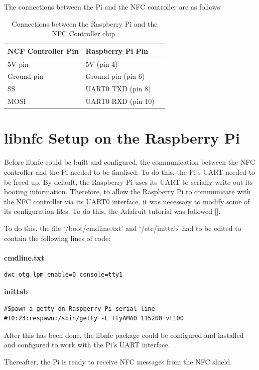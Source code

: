 The connections between the Pi and the NFC controller are as follows: 

\begin{table}
\centering
 \caption{Connections between the Raspberry Pi and the NFC Controller chip.}
 \begin{tabular}{|l|l|l|}
  \hline
  \textbf{NCF Controller Pin} & \textbf{Raspberry Pi Pin}\\\hline\hline
  5V pin & 5V (pin 4) \\\hline
  Ground pin & Ground pin (pin 6) \\\hline
  SS & UART0 TXD (pin 8) \\\hline
  MOSI & UART0 RXD (pin 10) \\\hline
 \end{tabular}
\end{table}

\section{libnfc Setup on the Raspberry Pi}

Before libnfc could be built and configured, the communication between the NFC
controller and the Pi needed to be finalised. To do this, the Pi's UART needed
to be freed up. By default, the Raspberry Pi uses its UART to serially write out
its booting information. Therefore, to allow the Raspberry Pi to communicate
with the NFC controller via its UART0 interface, it was necessary to modify
some of its configuration files. To do this, the Adafruit tutorial was followed
[\cite{website:adafruit-tutorial}].

To do this, the file `/boot/cmdline.txt' and `/etc/inittab' had to be edited to
contain the following lines of code:\\\\

\textbf{cmdline.txt}
\begin{verbatim}
dwc_otg.lpm_enable=0 console=tty1
\end{verbatim}

\textbf{inittab}
\begin{verbatim}
#Spawn a getty on Raspberry Pi serial line
#T0:23:respawn:/sbin/getty -L ttyAMA0 115200 vt100
\end{verbatim}

After this has been done, the libnfc package could be configured and installed
and configured to work with the Pi's UART interface.

Thereafter, the Pi is ready to receive NFC messages from the
NFC shield.

